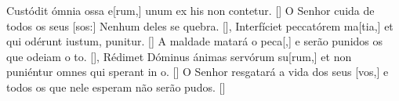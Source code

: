 {    %
    {Custódit ómnia ossa e[rum,] unum ex his non contetur. [\LinkLA]}%
        {O Senhor cuida de todos os seus [sos:] Nenhum deles se quebra. [\LinkPT]},
    {Interfíciet peccatórem ma[tia,] et qui odérunt iustum, puni\-tur. [\LinkLA]}%
        {A maldade matará o peca[,] e serão punidos os que odeiam o to. [\LinkPT]},
    {Rédimet Dóminus ánimas servórum su[rum,] et non puniéntur omnes qui sperant in o. [\LinkLA]}%
        {O Senhor resgatará a vida dos seus [vos,] e todos os que nele esperam não serão pudos. [\LinkPT]}%
}

\def\GloriaPatriPair{%
    {Glória Patri, et Fílio, et Spirítui Sanc\Flexa*{to,} sicut erat in princípio et nunc et \MediatioD{sem}[per,] et in sǽcula sæculórum. \TerminatioDI{A}men. \Responsorium{Gustáte}[\LinkLA]}%
        {Glória ao Pai e ao Filho e ao Espírito San\Flexa*{to,} como era no princípio, agora e \MediatioD{sem}[pre,] pelos séculos dos séculos. A\TerminatioDI{mém}. \Responsorium{Provai}[\LinkPT]}%
}